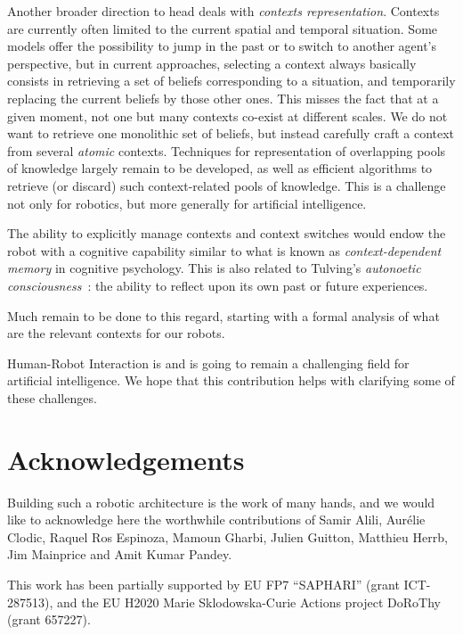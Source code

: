 \documentclass[preprint,3p,times]{elsarticle}
\begin{document}
Another broader direction to head deals with \emph{contexts representation}.
Contexts are currently often limited to the current spatial and temporal
situation. Some models offer the possibility to jump in the past or to
switch to another agent's perspective, but in current approaches, selecting a
context always basically consists in retrieving a set of beliefs corresponding
to a situation, and temporarily replacing the current beliefs by those other
ones. This misses the fact that at a given moment, not one but many contexts
co-exist at different scales. We do not want to retrieve one monolithic set of
beliefs, but instead carefully craft a context from several \emph{atomic}
contexts. Techniques for representation of overlapping pools of knowledge
largely remain to be developed, as well as efficient algorithms to retrieve (or
discard) such context-related pools of knowledge. This is a challenge not only
for robotics, but more generally for artificial intelligence.

The ability to explicitly manage contexts and context switches would endow the
robot with a cognitive capability similar to what is known as
\emph{context-dependent memory} in cognitive psychology. This is also related
to Tulving's \emph{autonoetic consciousness}~\cite{Tulving1985a}: the ability
to reflect upon its own past or future experiences.

Much remain to be done to this regard, starting with a formal analysis of what
are the relevant contexts for our robots.

Human-Robot Interaction is and is going to remain a challenging field for
artificial intelligence. We hope that this contribution helps with clarifying
some of these challenges.

\section*{Acknowledgements}

Building such a robotic architecture is the work of many hands, and we would
like to acknowledge here the worthwhile contributions of Samir Alili, Aurélie
Clodic, Raquel Ros Espinoza, Mamoun Gharbi, Julien Guitton, Matthieu Herrb, Jim
Mainprice and Amit Kumar Pandey.

This work has been partially supported by EU FP7 ``SAPHARI'' (grant ICT-287513),
and the EU H2020 Marie Sklodowska-Curie Actions project DoRoThy (grant 657227).




%

\end{document}
